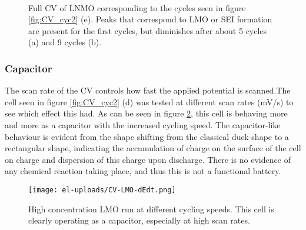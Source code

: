 \documentclass[Main/main.tex]{subfiles}
\begin{document}
\begin{figure}[ht]
    \centering
    \\
    \caption{Full CV of LNMO corresponding to the cycles seen in figure \ref{fig:CV_cyc2} (e). Peaks that correspond to LMO or SEI formation are present for the first cycles, but diminishes after about 5 cycles (a) and 9 cycles (b).}
    \label{fig:CV_LNMO}
\end{figure}    

\FloatBarrier

\subsubsection{Capacitor}
The scan rate of the CV controls how fast the applied potential is scanned.The cell seen in figure \ref{fig:CV_cyc2} (d) was tested at different scan rates (mV/s) to see which effect this had. As can be seen in figure \ref{fig:capacitor}, this cell is behaving more and more as a capacitor with the increased cycling speed. The capacitor-like behaviour is evident from the shape shifting from the classical duck-shape to a rectangular shape, indicating the accumulation of charge on the surface of the cell on charge and dispersion of this charge upon discharge. There is no evidence of any chemical reaction taking place, and thus this is not a functional battery.
\begin{figure}[ht]
    \centering
    \texttt{[image: el-uploads/CV-LMO-dEdt.png]}
    \caption{High concentration LMO run at different cycling speeds. This cell is clearly operating as a capacitor, especially at high scan rates.}
    \label{fig:capacitor}
\end{figure}


\FloatBarrier
\end{document}
